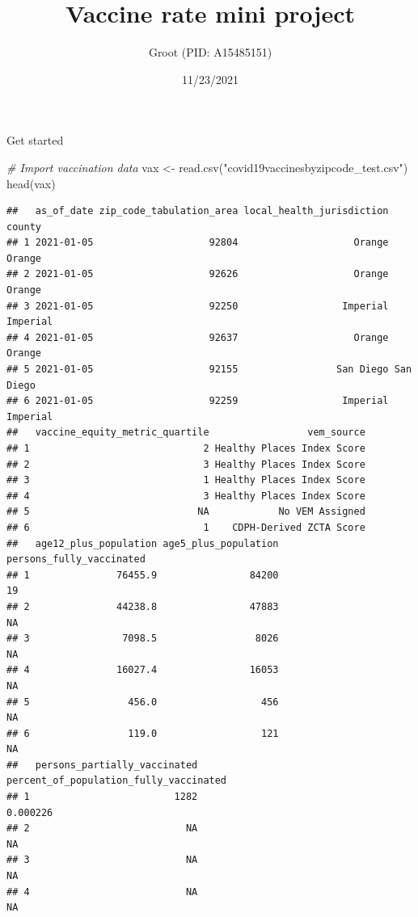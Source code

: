 \documentclass[
]{article}
\title{Vaccine rate mini project}
\author{Groot (PID: A15485151)}
\date{11/23/2021}
\newenvironment{Shaded}{\begin{snugshade}}{\end{snugshade}}
\newcommand{\CommentTok}[1]{\textcolor[rgb]{0.56,0.35,0.01}{\textit{#1}}}
\newcommand{\FunctionTok}[1]{\textcolor[rgb]{0.00,0.00,0.00}{#1}}
\newcommand{\NormalTok}[1]{#1}
\newcommand{\OtherTok}[1]{\textcolor[rgb]{0.56,0.35,0.01}{#1}}
\newcommand{\StringTok}[1]{\textcolor[rgb]{0.31,0.60,0.02}{#1}}
\begin{document}
\maketitle

Get started

\begin{Shaded}
\begin{Highlighting}[]
\CommentTok{\# Import vaccination data}
\NormalTok{vax }\OtherTok{\textless{}{-}} \FunctionTok{read.csv}\NormalTok{(}\StringTok{"covid19vaccinesbyzipcode\_test.csv"}\NormalTok{)}
\FunctionTok{head}\NormalTok{(vax)}
\end{Highlighting}
\end{Shaded}

\begin{verbatim}
##   as_of_date zip_code_tabulation_area local_health_jurisdiction    county
## 1 2021-01-05                    92804                    Orange    Orange
## 2 2021-01-05                    92626                    Orange    Orange
## 3 2021-01-05                    92250                  Imperial  Imperial
## 4 2021-01-05                    92637                    Orange    Orange
## 5 2021-01-05                    92155                 San Diego San Diego
## 6 2021-01-05                    92259                  Imperial  Imperial
##   vaccine_equity_metric_quartile                 vem_source
## 1                              2 Healthy Places Index Score
## 2                              3 Healthy Places Index Score
## 3                              1 Healthy Places Index Score
## 4                              3 Healthy Places Index Score
## 5                             NA            No VEM Assigned
## 6                              1    CDPH-Derived ZCTA Score
##   age12_plus_population age5_plus_population persons_fully_vaccinated
## 1               76455.9                84200                       19
## 2               44238.8                47883                       NA
## 3                7098.5                 8026                       NA
## 4               16027.4                16053                       NA
## 5                 456.0                  456                       NA
## 6                 119.0                  121                       NA
##   persons_partially_vaccinated percent_of_population_fully_vaccinated
## 1                         1282                               0.000226
## 2                           NA                                     NA
## 3                           NA                                     NA
## 4                           NA                                     NA

\end{verbatim}
\end{document}
